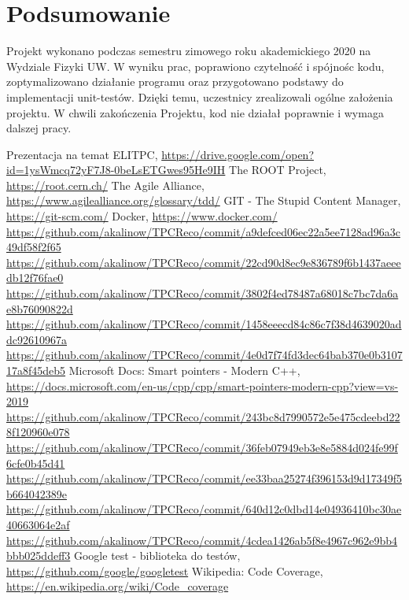 \documentclass{article}
\begin{document}
\section{Podsumowanie}
Projekt wykonano podczas semestru zimowego roku akademickiego 2020 na Wydziale Fizyki UW. W wyniku prac, poprawiono czytelność i spójnośc kodu, zoptymalizowano działanie programu oraz przygotowano podstawy do implementacji unit-testów. Dzięki temu, uczestnicy zrealizowali ogólne założenia projektu. W chwili zakończenia Projektu, kod nie działał poprawnie i wymaga dalszej pracy.

\begin{thebibliography}{99}
        Prezentacja na temat ELITPC, \url{https://drive.google.com/open?id=1ysWmcq72yF7J8-0beLsETGwes95He9IH}
        The ROOT Project, \url{https://root.cern.ch/}
        The Agile Alliance, \url{https://www.agilealliance.org/glossary/tdd/}
        GIT - The Stupid Content Manager, \url{https://git-scm.com/}
        Docker, \url{https://www.docker.com/}
        \url{https://github.com/akalinow/TPCReco/commit/a9defced06ec22a5ee7128ad96a3c49df58f2f65}
        \url{https://github.com/akalinow/TPCReco/commit/22cd90d8ec9e836789f6b1437aeeedb12f76fae0}
        \url{https://github.com/akalinow/TPCReco/commit/3802f4ed78487a68018c7bc7da6ae8b76090822d}
        \url{https://github.com/akalinow/TPCReco/commit/1458eeecd84c86c7f38d4639020addc92610967a}
        \url{https://github.com/akalinow/TPCReco/commit/4e0d7f74fd3dec64bab370e0b310717a8f45deb5}
        Microsoft Docs: Smart pointers - Modern C++, \url{https://docs.microsoft.com/en-us/cpp/cpp/smart-pointers-modern-cpp?view=vs-2019}
        \url{https://github.com/akalinow/TPCReco/commit/243bc8d7990572e5e475cdeebd228f120960e078}
        \url{https://github.com/akalinow/TPCReco/commit/36feb07949eb3e8e5884d024fe99f6cfe0b45d41}
        \url{https://github.com/akalinow/TPCReco/commit/ee33baa25274f396153d9d17349f5b664042389e}
        \url{https://github.com/akalinow/TPCReco/commit/640d12c0dbd14e04936410bc30ae40663064e2af}
        \url{https://github.com/akalinow/TPCReco/commit/4cdea1426ab5f8e4967c962e9bb4bbb025ddeff3}
        Google test - biblioteka do testów, \url{https://github.com/google/googletest}
        Wikipedia: Code Coverage, \url{https://en.wikipedia.org/wiki/Code\_coverage}
\end{thebibliography}
\end{document}
